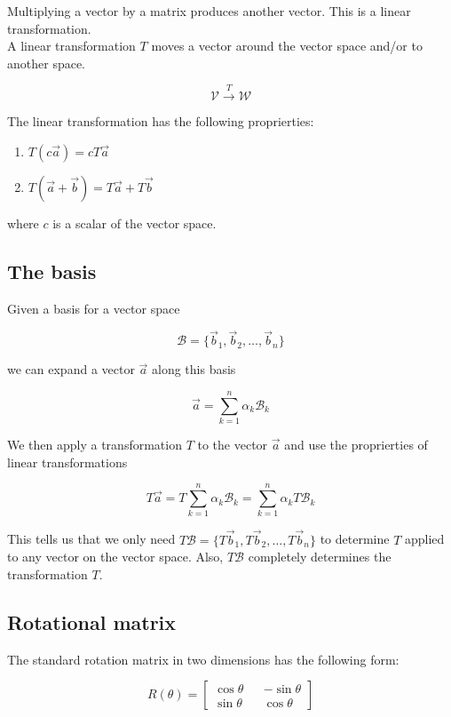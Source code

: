 \documentclass{article}
\begin{document}
Multiplying a vector by a matrix produces another vector. This is a linear transformation. \\
A linear transformation \(T\) moves a vector around the vector space and/or to another space.

\[
    \mathcal{V} \xrightarrow{T} \mathcal{W}
\]

The linear transformation has the following proprierties:

\begin{enumerate}
    \item \(T(c\vec{a})=cT\vec{a}\)
    \item \(T(\vec{a} + \vec{b}) = T\vec{a} + T\vec{b}\)
\end{enumerate}

where \(c\) is a scalar of the vector space.

\subsection{The basis}

Given a basis for a vector space

\[
    \mathcal{B}=\{\vec{b}_1, \vec{b}_2, \ldots, \vec{b}_n\}
\]

we can expand a vector \(\vec{a}\) along this basis

\[
    \vec{a} = \sum_{k=1}^{n} \alpha_k \mathcal{B}_k
\]

We then apply a transformation \(T\) to the vector \(\vec{a}\) and use the proprierties of linear transformations

\[
    T\vec{a}
    = T\sum_{k=1}^{n} \alpha_k \mathcal{B}_k
    = \sum_{k=1}^{n} \alpha_k T\mathcal{B}_k
\]

This tells us that we only need \(T\mathcal{B}=\{T\vec{b}_1, T\vec{b}_2, \ldots, T\vec{b}_n\}\)
to determine \(T\) applied to any vector on the vector space. Also, \(T\mathcal{B}\) completely determines the transformation \(T\).

\pagebreak

\subsection{Rotational matrix}

The standard rotation matrix in two dimensions has the following form:

\[
    R(\theta)=
    \begin{bmatrix} 
        \cos\theta && -\sin\theta \\
        \sin\theta && \cos\theta
    \end{bmatrix}
\]
\end{document}
